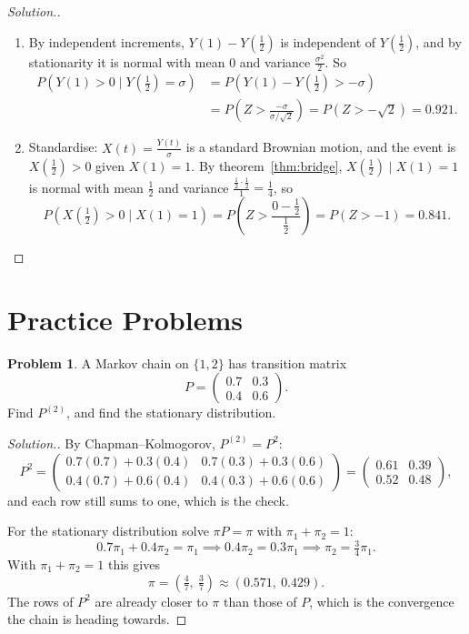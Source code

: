 \documentclass[12pt,a4paper]{report}
\theoremstyle{definition}
\newtheorem{problemx}{Problem}[section]
\newenvironment{problem}{\begin{problemx}}{\end{problemx}}
\newenvironment{solution}
  {\renewcommand{\qedsymbol}{}\begin{proof}[\textit{Solution}.]}
  {\end{proof}}
\begin{document}
\begin{solution}
\begin{enumerate}
\item[(a)] By independent increments, $Y(1) - Y(\frac12)$ is independent of $Y(\frac12)$, and by
stationarity it is normal with mean $0$ and variance $\frac{\sigma^2}{2}$. So
\begin{align*}
P\left(Y(1)>0\mid Y(\tfrac12) = \sigma\right) &= P\left(Y(1) - Y(\tfrac12)>-\sigma\right)\\
&= P\left(Z>\frac{-\sigma}{\sigma/\sqrt2}\right) = P(Z>-\sqrt2) = 0.921 .
\end{align*}
\item[(b)] Standardise: $X(t) = \frac{Y(t)}{\sigma}$ is a standard Brownian motion, and the event is
$X(\frac12)>0$ given $X(1) = 1$. By theorem~\ref{thm:bridge}, $X(\frac12)\mid X(1) = 1$ is normal with mean
$\frac12$ and variance $\frac{\frac12\cdot\frac12}{1} = \frac14$, so
\[P\left(X(\tfrac12)>0\mid X(1) = 1\right) = P\left(Z>\frac{0 - \frac12}{\frac12}\right) = P(Z>-1) = 0.841 .\]
\end{enumerate}
\end{solution}

\section{Practice Problems}

\begin{problem}
A Markov chain on $\{1,2\}$ has transition matrix
\[P = \begin{pmatrix} 0.7 & 0.3\\ 0.4 & 0.6 \end{pmatrix}.\]
Find $P^{(2)}$, and find the stationary distribution.
\end{problem}
\begin{solution}
By Chapman--Kolmogorov, $P^{(2)} = P^{2}$:
\[P^{2} = \begin{pmatrix} 0.7(0.7)+0.3(0.4) & 0.7(0.3)+0.3(0.6)\\
0.4(0.7)+0.6(0.4) & 0.4(0.3)+0.6(0.6)\end{pmatrix}
= \begin{pmatrix} 0.61 & 0.39\\ 0.52 & 0.48\end{pmatrix},\]
and each row still sums to one, which is the check.

For the stationary distribution solve $\pi P = \pi$ with $\pi_1+\pi_2=1$:
\[0.7\pi_1 + 0.4\pi_2 = \pi_1 \implies 0.4\pi_2 = 0.3\pi_1
\implies \pi_2 = \tfrac34\pi_1 .\]
With $\pi_1+\pi_2=1$ this gives
\[\pi = \left(\tfrac47,\ \tfrac37\right) \approx (0.571,\ 0.429).\]
The rows of $P^{2}$ are already closer to $\pi$ than those of $P$, which is the
convergence the chain is heading towards.
\end{solution}
\end{document}

